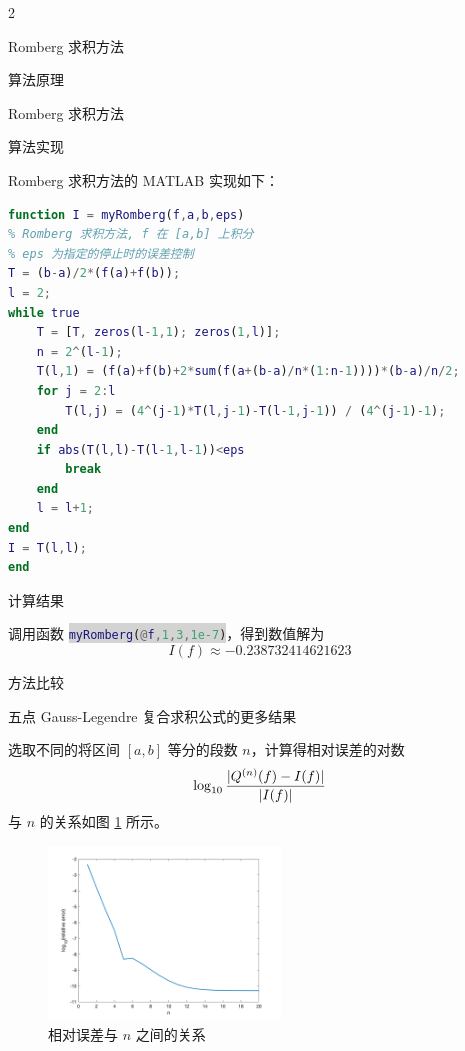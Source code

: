 \documentclass[a4paper]{article}
\newcommand{\inlinecode}[2]{\colorbox{lightgray}{\lstinline[language=#1]$#2$}}
\begin{document}
\begin{multicols}{2}
\begin{section}{Romberg 求积方法}
\begin{subsection}{算法原理}
\begin{subsubsection}{Romberg 求积方法}
		\end{subsubsection}
		
	\end{subsection}

	\begin{subsection}{算法实现}
	
		Romberg 求积方法的 MATLAB 实现如下：
		
\begin{lstlisting}[language=Matlab]
function I = myRomberg(f,a,b,eps)
% Romberg 求积方法, f 在 [a,b] 上积分
% eps 为指定的停止时的误差控制
T = (b-a)/2*(f(a)+f(b));
l = 2;
while true
    T = [T, zeros(l-1,1); zeros(1,l)];
    n = 2^(l-1);
    T(l,1) = (f(a)+f(b)+2*sum(f(a+(b-a)/n*(1:n-1))))*(b-a)/n/2;
    for j = 2:l
        T(l,j) = (4^(j-1)*T(l,j-1)-T(l-1,j-1)) / (4^(j-1)-1);
    end
    if abs(T(l,l)-T(l-1,l-1))<eps
        break
    end
    l = l+1;
end
I = T(l,l);
end
\end{lstlisting}
		
	\end{subsection}
	
	\begin{subsection}{计算结果}
		
		调用函数 \inlinecode{Matlab}{myRomberg(@f,1,3,1e-7)}，得到数值解为 $$I(f)\approx -0.238732414621623$$
		
	\end{subsection}
	
\end{section}

\begin{section}{方法比较}

	\begin{subsection}{五点 Gauss-Legendre 复合求积公式的更多结果}
		
		选取不同的将区间 $[a,b]$ 等分的段数 $n$，计算得相对误差的对数 $$\log_{10}{|Q^{(n)}(f)-I(f)| \over |I(f)|}$$ 与 $n$ 的关系如图 \ref{gauss} 所示。
		
		\begin{figure}[H]
			\centering
			\includegraphics[width = 0.55\textwidth]{img/gauss.png} 
			\caption{相对误差与 $n$ 之间的关系}
			\label{gauss} 
		\end{figure}
		

\end{subsection}
\end{section}
\end{multicols}
\end{document}
